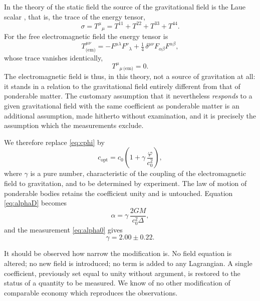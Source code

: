 \documentclass[aps,prd,reprint,amsmath,amssymb,nofootinbib,longbibliography]{revtex4-2}
\begin{document}
In the theory of the static field the source of the gravitational field is the Laue scalar
\cite{laue1911}, that is, the trace of the energy tensor,
\begin{equation}
\sigma = T^{\mu}{}_{\mu} = T^{11}+T^{22}+T^{33}+T^{44} .
\end{equation}
For the free electromagnetic field the energy tensor is
\begin{equation}
T^{\mu\nu}_{\text{(em)}} = -F^{\mu\lambda}F^{\nu}{}_{\lambda}
   + \tfrac{1}{4}\,\delta^{\mu\nu} F_{\alpha\beta}F^{\alpha\beta} ,
\end{equation}
whose trace vanishes identically,
\begin{equation}
T^{\mu}{}_{\mu\,\text{(em)}} = 0 .
\label{eq:trace}
\end{equation}
The electromagnetic field is thus, in this theory, not a source of gravitation at all: it stands in
a relation to the gravitational field entirely different from that of ponderable matter. The
customary assumption that it nevertheless \emph{responds} to a given gravitational field with the
same coefficient as ponderable matter is an additional assumption, made hitherto without
examination, and it is precisely the assumption which the measurements exclude.

We therefore replace \eqref{eq:cphi} by
\begin{equation}
c_{\text{opt}} = c_0\left( 1 + \gamma\,\frac{\varphi}{c_0^{2}} \right) ,
\label{eq:copt}
\end{equation}
where $\gamma$ is a pure number, characteristic of the coupling of the electromagnetic field to
gravitation, and to be determined by experiment. The law of motion of ponderable bodies retains the
coefficient unity and is untouched. Equation \eqref{eq:alphaD} becomes
\begin{equation}
\alpha = \gamma\,\frac{2GM}{c_0^{2}\Delta} ,
\label{eq:alphagamma}
\end{equation}
and the measurement \eqref{eq:alpha0} gives
\begin{equation}
\gamma = 2.00 \pm 0.22 .
\label{eq:gammaval}
\end{equation}

It should be observed how narrow the modification is. No field equation is altered; no new field is
introduced; no term is added to any Lagrangian. A single coefficient, previously set equal to unity
without argument, is restored to the status of a quantity to be measured. We know of no other
modification of comparable economy which reproduces the observations.
\end{document}
